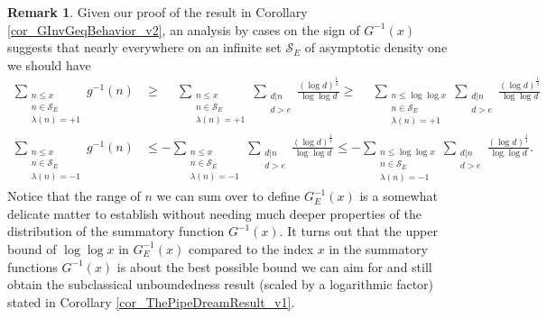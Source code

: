\documentclass[11pt,reqno,a4letter]{article}
\numberwithin{figure}{section}
\numberwithin{table}{section}
\theoremstyle{plain}
\numberwithin{theorem}{section}
\theoremstyle{definition}
\newtheorem{remark}[theorem]{Remark}
\begin{document}
\begin{remark} 
Given our proof of the result in Corollary \ref{cor_GInvGeqBehavior_v2}, an analysis 
by cases on the sign of $G^{-1}(x)$ suggests that nearly everywhere on an infinite set 
$\mathcal{S}_E$ of asymptotic density one we should have 
\begin{align*} 
\sum_{\substack{n \leq x \\ n \in \mathcal{S}_E \\ \lambda(n) = +1}} g^{-1}(n) & \geq 
     \phantom{-} \sum_{\substack{n \leq x \\ n \in \mathcal{S}_E \\ \lambda(n) = +1}} 
     \sum_{\substack{d|n \\ d > e}} \frac{(\log d)^{\frac{1}{4}}}{\log\log d} \geq \phantom{-} 
     \sum_{\substack{n \leq \log\log x \\ n \in \mathcal{S}_E \\ \lambda(n) = +1}} 
     \sum_{\substack{d|n \\ d > e}} \frac{(\log d)^{\frac{1}{4}}}{\log\log d} \\ 
\sum_{\substack{n \leq x \\ n \in \mathcal{S}_E \\ \lambda(n) = -1}} g^{-1}(n) & \leq 
     -\sum_{\substack{n \leq x \\ n \in \mathcal{S}_E \\ \lambda(n) = -1}}
     \sum_{\substack{d|n \\ d > e}} \frac{(\log d)^{\frac{1}{4}}}{\log\log d} \leq 
     -\sum_{\substack{n \leq \log\log x \\ n \in \mathcal{S}_E \\ \lambda(n) = -1}}
     \sum_{\substack{d|n \\ d > e}} \frac{(\log d)^{\frac{1}{4}}}{\log\log d}. 
\end{align*} 
Notice that the range of $n$ we can sum over to 
define $G_E^{-1}(x)$ is a somewhat delicate matter to establish without needing much 
deeper properties of the distribution of the summatory function $G^{-1}(x)$. It turns out that 
the upper bound of $\log\log x$ in $G_E^{-1}(x)$ compared to the index $x$ in the 
summatory functions $G^{-1}(x)$ is about the best possible bound we can aim for and still obtain 
the subclassical unboundedness result (scaled by a logarithmic factor) stated in 
Corollary \ref{cor_ThePipeDreamResult_v1}. 


\end{remark}
\end{document}
